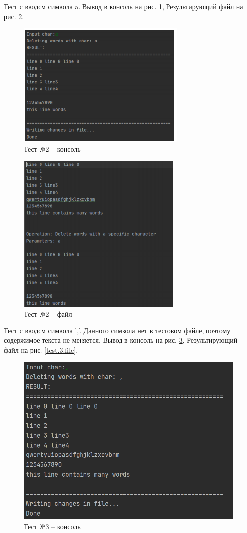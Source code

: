 \newpage

Тест с вводом символа a. Вывод в консоль на рис. \ref{test.2.console}, Результирующий
файл на рис. \ref{test.2.file}.

\begin{figure}[H]
	\centering
	\includegraphics[width=0.6\linewidth]{photo/test.2.console}
	\caption{Тест №2 -- консоль}
	\label{test.2.console}
\end{figure}

\begin{figure}[H]
	\centering
	\includegraphics[width=0.6\linewidth]{photo/test.2.file}
	\caption{Тест №2 -- файл}
	\label{test.2.file}
\end{figure}


Тест с вводом символа ','. 
Данного символа нет в тестовом файле,
поэтому содержимое текста не меняется.
Вывод в консоль на рис. \ref{test.3.console}, Результирующий
файл на рис. \ref{test.3.file}.

\begin{figure}[H]
	\centering
	\includegraphics[width=0.6\linewidth]{photo/test.3.console}
	\caption{Тест №3 -- консоль}
	\label{test.3.console}
\end{figure}


